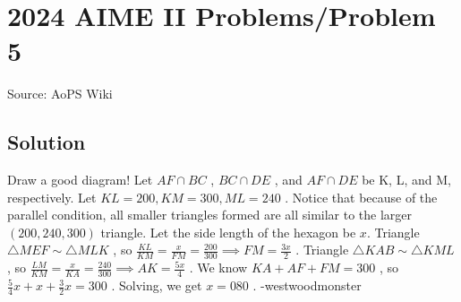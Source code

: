 \documentclass[12pt]{article}
\begin{document}
\section*{{2024 AIME II Problems/Problem 5}}
Source: AoPS Wiki

\subsection*{Solution}
Draw a good diagram!
Let $AF \cap BC$ , $BC \cap DE$ , and $AF \cap DE$ be K, L, and M, respectively. Let $KL=200, KM=300, ML=240$ . Notice that because of the parallel condition, all smaller triangles formed are all similar to the larger $(200,240,300)$ triangle. Let the side length of the hexagon be $x.$ Triangle $\triangle MEF \sim \triangle MLK$ , so $\frac{KL}{KM} =\frac{x}{FM} =\frac{200}{300} \implies FM=\frac{3x}{2}$ . Triangle $\triangle KAB \sim \triangle KML$ , so $\frac{LM}{KM}=\frac{x}{KA} = \frac{240}{300} \implies AK=\frac{5x}{4}$ . We know $KA+AF+FM=300$ , so $\frac{5}{4}x + x + \frac{3}{2}x = 300$ . Solving, we get $x=\boxed{080}$ . -westwoodmonster
\end{document}
